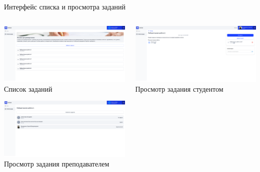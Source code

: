 \documentclass[aspectratio=169]{beamer}
\begin{document}
\begin{frame}{Интерфейс списка и просмотра заданий}
\vspace{0.5em}

\begin{columns}
    \begin{column}{0.5\textwidth}
        \centering
        \includegraphics[width=0.9\linewidth]{static/TaskListTeacher.png} \\
        \small Список заданий

        \vspace{1em}

        \includegraphics[width=0.9\linewidth]{static/TaskTeacherDetail.png} \\
        \small Просмотр задания преподавателем
    \end{column}
    \begin{column}{0.5\textwidth}
        \centering
        \includegraphics[width=0.95\linewidth]{static/TaskStudentNotSend.png} \\
        \small Просмотр задания студентом
    \end{column}
\end{columns}
\end{frame}
\end{document}
